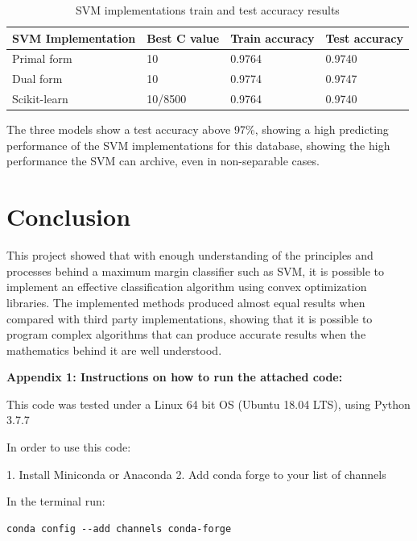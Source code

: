 \documentclass[11pt,twocolumn,letterpaper]{article}
\begin{document}
\begin{table}[h]
	\begin{center}
		\begin{tabular}{|p{2cm}|p{1.5cm}|p{1.5cm}|p{1.5cm}|}
			\hline
			SVM Implementation & Best C value & Train accuracy & Test accuracy \\
			\hline\hline
			Primal form & 10 & 0.9764 & 0.9740\\
			Dual form & 10 & 0.9774 & 0.9747\\
			Scikit-learn & 10/8500 & 0.9764 & 0.9740\\
			\hline
		\end{tabular}
	\end{center}
	\caption{SVM implementations train and test accuracy results}
	\label{table:results}
\end{table}

The three models show a test accuracy above 97\%, showing a high predicting performance of the SVM implementations for this database, showing the high performance the SVM can archive, even in non-separable cases.

\section{Conclusion}

This project showed that with enough understanding of the principles and processes behind a maximum margin classifier such as SVM, it is possible to implement an effective classification algorithm using convex optimization libraries. The implemented methods produced almost equal results when compared with third party implementations, showing that it is possible to program complex algorithms that can produce accurate results when the mathematics behind it are well understood.

{\small


}


\textbf{Appendix 1: Instructions on how to run the attached code:}

This code was tested under a Linux 64 bit OS (Ubuntu 18.04 LTS), using Python 3.7.7

In order to use this code:

1. Install Miniconda or Anaconda
2. Add conda forge to your list of channels

In the terminal run:
\begin{verbatim}
conda config --add channels conda-forge
\end{verbatim}
\end{document}
